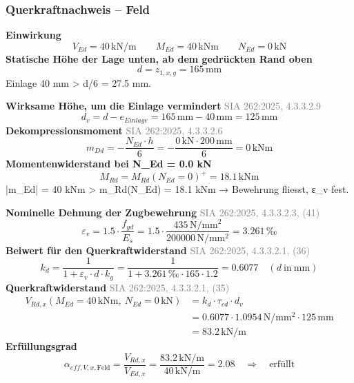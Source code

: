 \documentclass[11pt,a4paper]{article}
\newcommand{\normref}[1]{{\small\textcolor{gray}{#1}}}
\begin{document}
\subsubsection{Querkraftnachweis – Feld}
\noindent\textbf{Einwirkung}
\begin{equation*}
V_{Ed} = 40\,\mathrm{kN}/\mathrm{m} \qquad M_{Ed} = 40\,\mathrm{kNm} \qquad N_{Ed} = 0\,\mathrm{kN}
\end{equation*}
\noindent\textbf{Statische Höhe der Lage unten, ab dem gedrückten Rand oben}
\begin{equation*}
d = z_{1,x,g} = 165\,\mathrm{mm}
\end{equation*}
Einlage 40 mm > d/6 = 27.5 mm.

\noindent\textbf{Wirksame Höhe, um die Einlage vermindert} \hfill \normref{SIA 262:2025, 4.3.3.2.9}
\begin{equation*}
d_v = d - e_{Einlage} = 165\,\mathrm{mm} - 40\,\mathrm{mm} = 125\,\mathrm{mm}
\end{equation*}
\noindent\textbf{Dekompressionsmoment} \hfill \normref{SIA 262:2025, 4.3.3.2.6}
\begin{equation*}
m_{Dd} = -\frac{N_{Ed} \cdot h}{6} = -\frac{0\,\mathrm{kN} \cdot 200\,\mathrm{mm}}{6} = 0\,\mathrm{kNm}
\end{equation*}
\noindent\textbf{Momentenwiderstand bei N\_Ed = 0.0 kN}
\begin{equation*}
M_{Rd} = M_{Rd}(N_{Ed}=0)^{+} = 18.1\,\mathrm{kNm}
\end{equation*}
|m\_Ed| = 40 kNm > m\_Rd(N\_Ed) = 18.1 kNm → Bewehrung fliesst, ε\_v fest.

\noindent\textbf{Nominelle Dehnung der Zugbewehrung} \hfill \normref{SIA 262:2025, 4.3.3.2.3, (41)}
\begin{equation*}
\varepsilon_v = 1.5 \cdot \frac{f_{yd}}{E_s} = 1.5 \cdot \frac{435\,\mathrm{N}/\mathrm{mm}^{2}}{200000\,\mathrm{N}/\mathrm{mm}^{2}} = 3.261\,\text{‰}
\end{equation*}
\noindent\textbf{Beiwert für den Querkraftwiderstand} \hfill \normref{SIA 262:2025, 4.3.3.2.1, (36)}
\begin{equation*}
k_d = \frac{1}{1 + \varepsilon_v \cdot d \cdot k_g} = \frac{1}{1 + 3.261\,\text{‰} \cdot 165 \cdot 1.2} = 0.6077 \quad \left(d\ \text{in}\ \mathrm{mm}\right)
\end{equation*}
\noindent\textbf{Querkraftwiderstand} \hfill \normref{SIA 262:2025, 4.3.3.2.1, (35)}
\begin{equation*}
\begin{aligned}
  V_{Rd,x}(M_{Ed} = 40\,\mathrm{kNm},\ N_{Ed} = 0\,\mathrm{kN}) &= k_d \cdot \tau_{cd} \cdot d_v \\
  &= 0.6077 \cdot 1.0954\,\mathrm{N}/\mathrm{mm}^{2} \cdot 125\,\mathrm{mm} \\
  &= 83.2\,\mathrm{kN}/\mathrm{m}
\end{aligned}
\end{equation*}
\noindent\textbf{Erfüllungsgrad}
\begin{equation*}
\alpha_{eff,V,x,\text{Feld}} = \frac{V_{Rd,x}}{V_{Ed,x}} = \frac{83.2\,\mathrm{kN}/\mathrm{m}}{40\,\mathrm{kN}/\mathrm{m}} = 2.08 \quad \Rightarrow \quad \text{erfüllt}
\end{equation*}
\end{document}
